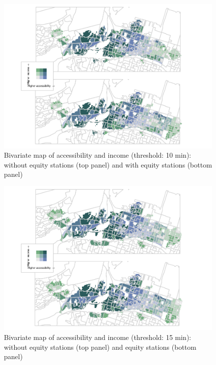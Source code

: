 \documentclass[]{elsarticle} %
\begin{document}
\begin{figure}
\includegraphics[width=1\linewidth]{Bike-share-spatial-equity_files/figure-latex/figure-bi-map-threshold-10-1} \caption{\label{fig-bivariate-map-threshold-10}Bivariate map of accessibility and income (threshold: 10 min): without equity stations (top panel) and with equity stations (bottom panel)}\label{fig:figure-bi-map-threshold-10}
\end{figure}

\begin{figure}
\includegraphics[width=1\linewidth]{Bike-share-spatial-equity_files/figure-latex/figure-bi-map-threshold-15-1} \caption{\label{fig-bivariate-map-threshold-15}Bivariate map of accessibility and income (threshold: 15 min): without equity stations (top panel) and equity stations (bottom panel)}\label{fig:figure-bi-map-threshold-15}
\end{figure}
\end{document}
